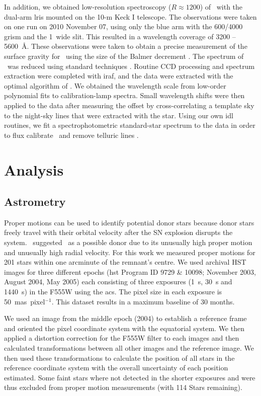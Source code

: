 In addition, we obtained low-resolution spectroscopy ($R\approx1200$) of
\starb\ with the dual-arm \gls{lris} mounted on the 10-m Keck I telescope. The
observations were taken on one run on 2010 November 07, using only the blue
arm with the 600/4000 grism and the 1\arcsec\ wide slit. This resulted
in a wavelength coverage of 3200 -- 5600~\AA. These observations
were taken to obtain a precise  measurement of the surface gravity for \starb\ using the size of the Balmer decrement \citep{2007PASP..119..605B}.
The spectrum of \starb\ was reduced using standard techniques \citep[e.g.][]{Foley03}. Routine CCD processing and spectrum extraction
were completed with \gls{iraf}, and the data were extracted with
the optimal algorithm of \citet{Horne86}. We obtained the wavelength
scale from low-order polynomial fits to calibration-lamp spectra.
Small wavelength shifts were then applied to the data after measuring the offset by
cross-correlating a template sky to the night-sky lines that were
extracted with the star. Using our own \gls{idl} routines, we fit a
spectrophotometric standard-star spectrum to the data in order to flux
calibrate \starb\ and remove telluric lines \citep{Horne86,Matheson00}.


\section{Analysis}
\label{sec:analysis}

\subsection{Astrometry}
\label{sec:propmot}
Proper motions can be used to identify potential donor stars because donor stars freely travel with their orbital velocity after the SN explosion disrupts the system. \rl\ suggested \starg\ as a possible donor due to its unusually high proper motion and unusually high radial velocity. For this work we measured proper motions for 201 stars within one arcminute of the remnant's centre. We used archival HST images for three different epochs (\gls{hst} Program ID  9729 \& 10098; November 2003, August 2004, May 2005) each consisting of three exposures (1~s, 30~s and 1440~s) in the F555W using the \gls{acs}. The pixel size in each exposure is 50~mas~pixel$^{-1}$. This dataset results in a maximum baseline of 30 months. 


We used an image from the middle epoch (2004) to establish a reference frame and oriented the pixel coordinate system with the equatorial system. We then applied a distortion correction for the F555W filter \citep{2006acs..rept....1A} to each images and then calculated transformations between all other images and the reference image. We then used these transformations to calculate the position of all stars in the reference coordinate system  with the overall uncertainty of each position estimated.
Some faint stars where not detected in the shorter exposures and were thus excluded from proper motion measurements (with 114 Stars remaining).

